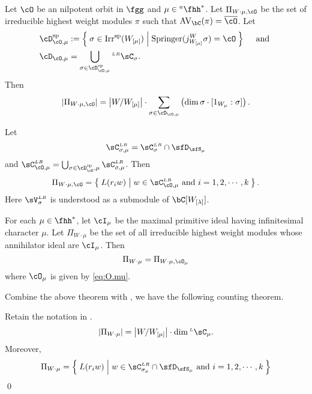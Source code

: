 \documentclass[counting_main.tex]{subfiles}
\begin{document}
\begin{thm}
  Let $\cO$ be an nilpotent orbit in $\fgg$ and $\mu\in \ahh^{*}$. Let
  $\Pi_{W\cdot \mu, \cO}$ be the set of irreducible highest weight modules $\pi$
  such that $\AVC(\pi) = \bcO$. Let
  \begin{equation}\label{eq:DC.O.mu}
    \begin{split}
      \Dsp_{\cO,\mu} &:= \Set{\sigma\in \Irrsp(W_{[\mu]})|\Spr(j_{W_{[\mu]}}^{W}\sigma) = \cO}\quad \text{
        and }\\
      \cD_{\cO,\mu} &= \bigcup_{\sigma\in \Dsp_{\cO,\mu}} \LRC_{\sigma}.
    \end{split}
  \end{equation}
  Then
  \[
    \abs{\Pi_{W\cdot\mu,\cO}} = \abs{W/W_{[\mu]}}\cdot \sum_{\sigma\in \cD_{\cO,\mu}} \left(\dim \sigma \cdot [1_{W_{\mu}}:\sigma]\right).
  \]


  Let
  \[
    \CLR_{\sigma,\mu} = \CLR_{\sigma}\cap \sfD_{\sfS_{\mu}}
  \]
  and $\CLR_{\cO,\mu} = \bigcup_{\sigma\in \Dsp_{\cO},\mu} \CLR_{\sigma,\mu}$. Then
  \[
    \Pi_{W\cdot\mu,\cO} = \Set{L(r_{i}w)|w\in \CLR_{\cO,\mu} \text{ and
      } i=1,2,\cdots,k} .
  \]
  Here $\VLR_{\sigma}$ is understood as a submodule of $\bC[\Wlam]$.
\end{thm}



For each $\mu\in \fhh^{*}$, let $\cI_{\mu}$ be the maximal primitive ideal
having infinitesimal character $\mu$. Let $\Pi_{W\cdot \mu}$ be the set of all
irreducible highest weight modules whose annihilator ideal are $\cI_{\mu}$. Then
\[
  \Pi_{W\cdot \mu} = \Pi_{W\cdot \mu, \cO_{\mu}}
\]
where $\cO_{\mu}$ is given by \eqref{eq:O.mu}.


Combine the above theorem with , we have the following
counting theorem.
\begin{thm}
  Retain the notation in
  .
  \[ \abs{\Pi_{W\cdot \mu}} = \abs{W/W_{[\mu]}}\cdot \dim \LC_{\mu}.
  \]
  Moreover,
  \[
    \Pi_{W\cdot\mu} = \Set{L(r_{i}w)|w\in \CLR_{\sigma_{\mu}}\cap \sfD_{\sfS_{\mu}} \text{
        and } i=1,2,\cdots,k}
  \]
  \qed
\end{thm}
\end{document}
